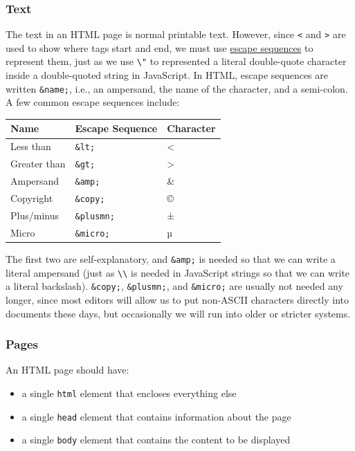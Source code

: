 \subsubsection{Text}\label{s:htmlcss-text}

The text in an HTML page is normal printable text. However, since
\texttt{\textless{}} and \texttt{\textgreater{}} are used to show where
tags start and end, we must use
\protect\hyperlink{g:escape-sequence}{escape sequences} to represent
them, just as we use \texttt{\textbackslash{}"} to represented a literal
double-quote character inside a double-quoted string in JavaScript. In
HTML, escape sequences are written \texttt{\&name;}, i.e., an ampersand,
the name of the character, and a semi-colon. A few common escape
sequences include:

\begin{longtable}[]{@{}lll@{}}
\toprule
Name & Escape Sequence & Character\tabularnewline
\midrule
\endhead
Less than & \texttt{\&lt;} & \textless{}\tabularnewline
Greater than & \texttt{\&gt;} & \textgreater{}\tabularnewline
Ampersand & \texttt{\&amp;} & \&\tabularnewline
Copyright & \texttt{\&copy;} & ©\tabularnewline
Plus/minus & \texttt{\&plusmn;} & ±\tabularnewline
Micro & \texttt{\&micro;} & µ\tabularnewline
\bottomrule
\end{longtable}

The first two are self-explanatory, and \texttt{\&amp;} is needed so
that we can write a literal ampersand (just as
\texttt{\textbackslash{}\textbackslash{}} is needed in JavaScript
strings so that we can write a literal backslash). \texttt{\&copy;},
\texttt{\&plusmn;}, and \texttt{\&micro;} are usually not needed any
longer, since most editors will allow us to put non-ASCII characters
directly into documents these days, but occasionally we will run into
older or stricter systems.

\subsubsection{Pages}\label{s:htmlcss-pages}

An HTML page should have:

\begin{itemize}
\tightlist
\item
  a single \texttt{html} element that encloses everything else
\item
  a single \texttt{head} element that contains information about the
  page
\item
  a single \texttt{body} element that contains the content to be
  displayed
\end{itemize}

